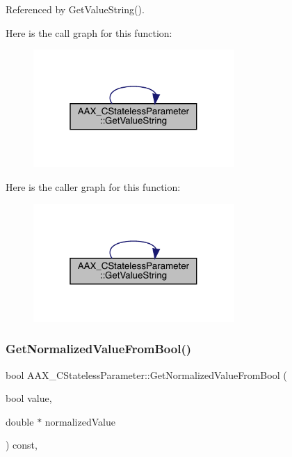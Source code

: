 Referenced by Get\+Value\+String().

Here is the call graph for this function\+:
\nopagebreak
\begin{figure}[H]
\begin{center}
\leavevmode
\includegraphics[width=217pt]{a01541_a3aaad9f8df319b7dd6c2934cd9d525b3_cgraph}
\end{center}
\end{figure}
Here is the caller graph for this function\+:
\nopagebreak
\begin{figure}[H]
\begin{center}
\leavevmode
\includegraphics[width=217pt]{a01541_a3aaad9f8df319b7dd6c2934cd9d525b3_icgraph}
\end{center}
\end{figure}
\mbox{\label{a01541_a4e6ba770bb335f45742d809a276bd0f8}} 
\subsubsection{\texorpdfstring{GetNormalizedValueFromBool()}{GetNormalizedValueFromBool()}}
{\footnotesize\ttfamily bool A\+A\+X\+\_\+\+C\+Stateless\+Parameter\+::\+Get\+Normalized\+Value\+From\+Bool (\begin{DoxyParamCaption}\item[{bool}]{value,  }\item[{double $\ast$}]{normalized\+Value }\end{DoxyParamCaption}) const\hspace{0.3cm}{\ttfamily [inline]}, {\ttfamily [virtual]}}



